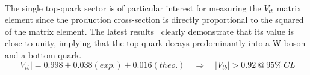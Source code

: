 \\
The single top-quark sector is of particular interest for measuring the $V_{tb}$ matrix element since the production cross-section is directly proportional to the squared of the matrix element. The latest results~\cite{CMSVtbResult} clearly demonstrate that its value is close to unity, implying that the top quark decays predominantly into a W-boson and a bottom quark. 
\begin{equation}
 \vert V_{tb} \vert = 0.998 \pm 0.038 (exp.) \pm 0.016 (theo.) \quad \Rightarrow \quad \vert V_{tb} \vert > 0.92 ~ @ ~ 95 \% ~ CL
\end{equation}

